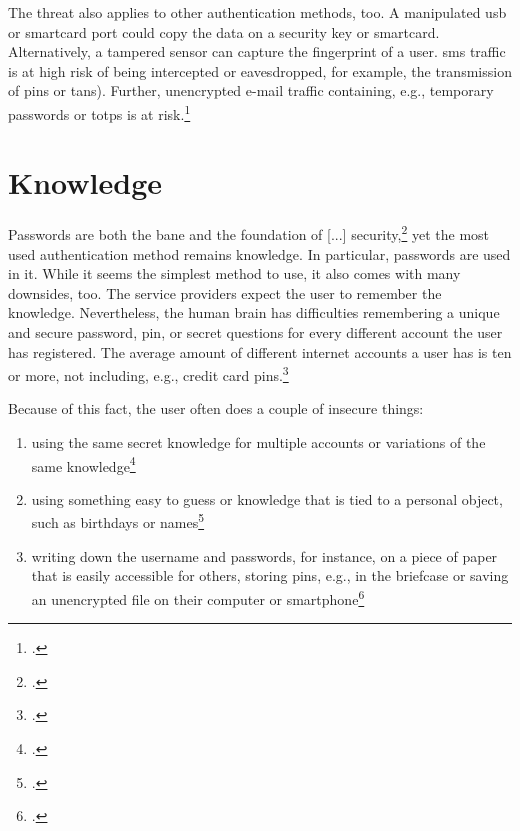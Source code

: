 The threat also applies to other authentication methods, too. A manipulated \gls{usb} or smartcard port could copy the data on a security key or smartcard. Alternatively, a tampered sensor can capture the fingerprint of a user. \gls{sms} traffic is at high risk of being intercepted or eavesdropped, for example, the transmission of \glspl{pin} or \glspl{tan}). Further, unencrypted e-mail traffic containing, e.g., temporary passwords or \glspl{totp} is at risk.\footcites[See][103]{2241278}[See][58]{dotson2019practical}[See][6]{1698485}


\section{Knowledge}

\frqq Passwords are both the bane and the foundation of [...] security\flqq{},\footcite[206]{517355} yet the most used authentication method remains knowledge. In particular, passwords are used in \gls{it}. While it seems the simplest method to use, it also comes with many downsides, too. The service providers expect the user to remember the knowledge. Nevertheless, the human brain has difficulties remembering a unique and secure password, \gls{pin}, or secret questions for every different account the user has registered. The average amount of different internet accounts a user has is ten or more, not including, e.g., credit card \glspl{pin}.\footcites[See][7, 9]{lastpass}[See][424]{320284}

Because of this fact, the user often does a couple of insecure things:

\begin{enumerate}[label=(\alph*)]
	\item using the same secret knowledge for multiple accounts or variations of the same knowledge\footcites[See][8]{yougov}[See][14]{sweden-passwords}[See][7]{lastpass}
	\item using something easy to guess or knowledge that is tied to a personal object, such as birthdays or names\footcites[See][]{web-de-passwords}[See][34]{anderson2008security}
	\item writing down the username and passwords, for instance, on a piece of paper that is easily accessible for others, storing \glspl{pin}, e.g., in the briefcase or saving an unencrypted file on their computer or smartphone\footcites[See][]{web-de-passwords}[See][6]{yougov2}

\end{enumerate}

